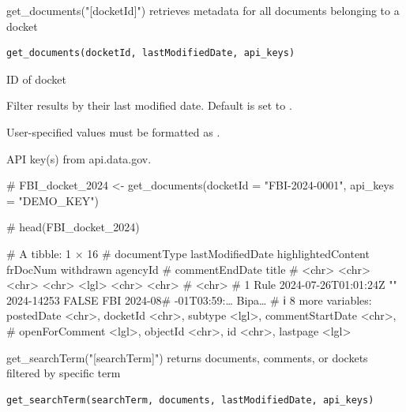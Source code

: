 \documentclass[a4paper]{book}
\begin{document}
%
\begin{Description}
get\_documents("[docketId]") retrieves metadata for all documents belonging to a docket 
\end{Description}
%
\begin{Usage}
\begin{verbatim}
get_documents(docketId, lastModifiedDate, api_keys)
\end{verbatim}
\end{Usage}
%
\begin{Arguments}
\begin{ldescription}
\item[\code{docketId}] 
ID of docket

\item[\code{lastModifiedDate}] 
Filter results by their last modified date. Default is set to . 

User-specified values must be formatted as .


\item[\code{api\_keys}] API key(s) from api.data.gov. 

\end{ldescription}
\end{Arguments}
%
\begin{Examples}
\begin{ExampleCode}

# FBI_docket_2024 <- get_documents(docketId = "FBI-2024-0001", api_keys = "DEMO_KEY")

# head(FBI_docket_2024)

# A tibble: 1 × 16
#   documentType lastModifiedDate     highlightedContent frDocNum   withdrawn agencyId # commentEndDate     title
#   <chr>        <chr>                <chr>              <chr>      <lgl>     <chr>    <chr>       #        <chr>
# 1 Rule         2024-07-26T01:01:24Z ""                 2024-14253 FALSE     FBI      2024-08# -01T03:59:… Bipa…
# ℹ 8 more variables: postedDate <chr>, docketId <chr>, subtype <lgl>, commentStartDate <chr>,
#   openForComment <lgl>, objectId <chr>, id <chr>, lastpage <lgl>
\end{ExampleCode}
\end{Examples}
%
\begin{Description}
get\_searchTerm("[searchTerm]") returns documents, comments, or dockets filtered by specific term
\end{Description}
%
\begin{Usage}
\begin{verbatim}
get_searchTerm(searchTerm, documents, lastModifiedDate, api_keys)
\end{verbatim}
\end{Usage}
\end{document}
